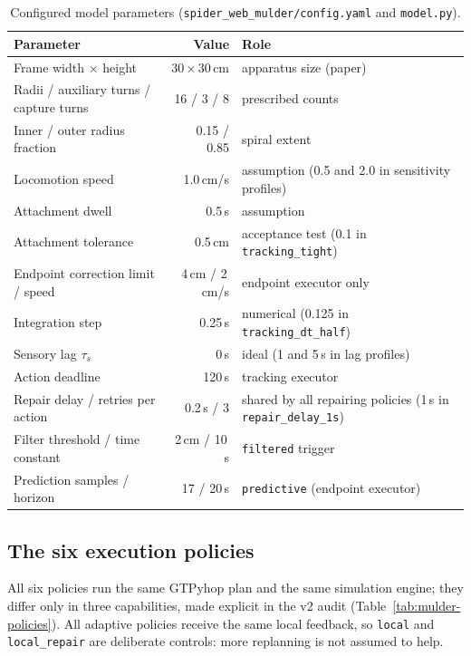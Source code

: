 \begin{table}[htbp]
\centering
\small
\begin{tabularx}{\linewidth}{@{}l r X@{}}
\toprule
Parameter & Value & Role \\
\midrule
Frame width $\times$ height & $30\times30$\,cm & apparatus size (paper) \\
Radii / auxiliary turns / capture turns & 16 / 3 / 8 & prescribed counts \\
Inner / outer radius fraction & 0.15 / 0.85 & spiral extent \\
Locomotion speed & 1.0\,cm/s & assumption (0.5 and 2.0 in sensitivity profiles) \\
Attachment dwell & 0.5\,s & assumption \\
Attachment tolerance & 0.5\,cm & acceptance test (0.1 in \texttt{tracking\_\allowbreak{}tight}) \\
Endpoint correction limit / speed & 4\,cm / 2\,cm/s & endpoint executor only \\
Integration step & 0.25\,s & numerical (0.125 in \texttt{tracking\_\allowbreak{}dt\_\allowbreak{}half}) \\
Sensory lag $\tau_s$ & 0\,s & ideal (1 and 5\,s in lag profiles) \\
Action deadline & 120\,s & tracking executor \\
Repair delay / retries per action & 0.2\,s / 3 & shared by all repairing policies (1\,s in \texttt{repair\_\allowbreak{}delay\_\allowbreak{}1s}) \\
Filter threshold / time constant & 2\,cm / 10\,s & \texttt{filtered} trigger \\
Prediction samples / horizon & 17 / 20\,s & \texttt{predictive} (endpoint executor) \\
\bottomrule
\end{tabularx}
\caption{Configured model parameters (\texttt{spider\_\allowbreak{}web\_\allowbreak{}mulder/\allowbreak{}config.yaml} and \texttt{model.py}).}
\label{tab:mulder-params}
\end{table}

\subsection{The six execution policies}
\label{sec:mulder-policies}

All six policies run the same GTPyhop plan and the same simulation engine; they differ only in three
capabilities, made explicit in the v2 audit (Table~\ref{tab:mulder-policies}). All adaptive policies
receive the same local feedback, so \texttt{local} and \texttt{local\_\allowbreak{}repair} are deliberate controls:
more replanning is not assumed to help.

